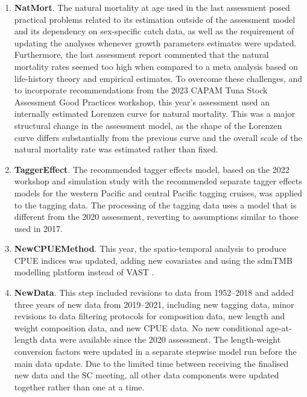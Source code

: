 \begin{enumerate}
  \item \textbf{NatMort}. The natural mortality at age used in the last assessment posed practical problems related to its estimation outside of the assessment model and its dependency on sex-specific catch data, as well as the requirement of updating the analyses whenever growth parameters estimates were updated. Furthermore, the last assessment report commented that the natural mortality rates seemed too high when compared to a meta analysis based on life-history theory and empirical estimates. To overcome these challenges, and to incorporate recommendations from the 2023 CAPAM Tuna Stock Assessment Good Practices workshop, this year's assessment used an internally estimated Lorenzen curve for natural mortality. This was a major structural change in the assessment model, as the shape of the Lorenzen curve differs substantially from the previous curve and the overall scale of the natural mortality rate was estimated rather than fixed.

  \item \textbf{TaggerEffect}. The recommended tagger effects model, based on the 2022 workshop and simulation study \citep{peatman_analysis_2022-1,peatman_analysis_2023-1} with the recommended separate tagger effects models for the western Pacific and central Pacific tagging cruises, was applied to the tagging data. The processing of the tagging data uses a model that is different from the 2020 assessment, reverting to assumptions similar to those used in 2017.

  \item \textbf{NewCPUEMethod}. This year, the spatio-temporal analysis to produce CPUE indices was updated, adding new covariates and using the sdmTMB modelling platform instead of VAST \citep{teears_cpue_2023}.

  \item \textbf{NewData}. This step included revisions to data from 1952--2018 and added three years of new data from 2019--2021, including new tagging data, minor revisions to data filtering protocols for composition data, new length and weight composition data, and new CPUE data. No new conditional age-at-length data were available since the 2020 assessment. The length-weight conversion factors were updated in a separate stepwise model run before the main data update. Due to the limited time between receiving the finalised new data and the SC meeting, all other data components were updated together rather than one at a time.


\end{enumerate}
